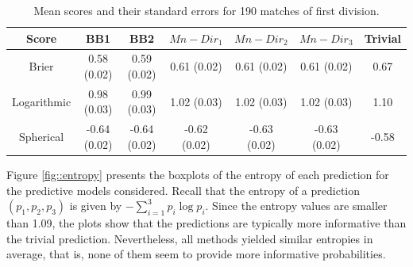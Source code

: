 \documentclass[journal,article,accept,moreauthors,pdftex,12pt,a4paper]{mdpi}
\begin{document}
    \begin{table}[H]
        \begin{center}
            \begin{tabular}{ccccccc}
                \hline
                Score & BB1 & BB2 & $Mn-Dir_1$ & $Mn-Dir_2$ & $Mn-Dir_3$ & Trivial \\
                \hline
                \hline
                Brier &0.58 (0.02) & 0.59 (0.02)& 0.61 (0.02)& 0.61 (0.02) & 0.61  (0.02) & 0.67 \\
                Logarithmic & 0.98 (0.03) & 0.99 (0.03) & 1.02 (0.03)  & 1.02 (0.03)  & 1.02 (0.03) & 1.10  \\
                Spherical &  -0.64 (0.02)& -0.64 (0.02)& -0.62 (0.02)& -0.63 (0.02)& -0.63 (0.02)& -0.58\\
                \hline
            \end{tabular}
            \caption{Mean scores and their standard errors for 190 matches of first division.}
            \label{tab::brier}
        \end{center}
    \end{table}


    Figure \ref{fig::entropy} presents the boxplots of the entropy of each prediction for the predictive models considered. Recall
    that the entropy of a prediction $(p_1,p_2,p_3)$ is given by $- \sum_{i=1}^3 p_i \log{p_i}$.
    Since the entropy values are smaller than 1.09, the plots show that the predictions
    are typically more informative than the trivial prediction. Nevertheless, all methods yielded similar entropies in average, that is,
    none of them seem to provide more informative probabilities.
\end{document}
